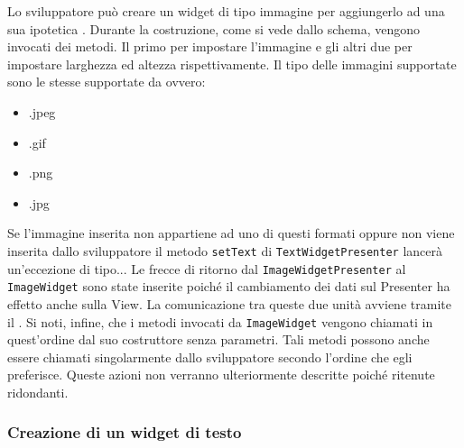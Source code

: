 Lo sviluppatore può creare un widget di tipo immagine per aggiungerlo ad una sua ipotetica . Durante la costruzione, come si vede dallo schema, vengono invocati dei metodi. Il primo per impostare l'immagine e gli altri due per impostare larghezza ed altezza rispettivamente. Il tipo delle immagini supportate sono le stesse supportate da  ovvero:
\begin{itemize}
\item .jpeg
\item .gif
\item .png
\item .jpg
\end{itemize}
Se l'immagine inserita non appartiene ad uno di questi formati oppure non viene inserita dallo sviluppatore il metodo \texttt{setText} di \texttt{TextWidgetPresenter} lancerà un'eccezione di tipo...
Le frecce di ritorno dal \texttt{ImageWidgetPresenter} al \texttt{ImageWidget} sono state inserite poiché il cambiamento dei dati sul Presenter ha effetto anche sulla View. La comunicazione tra queste due unità avviene tramite il  .
Si noti, infine, che i metodi invocati da \texttt{ImageWidget} vengono chiamati in quest'ordine dal suo costruttore senza parametri. Tali metodi possono anche essere chiamati singolarmente dallo sviluppatore secondo l'ordine che egli preferisce. Queste azioni non verranno ulteriormente descritte poiché ritenute ridondanti.

\newpage

\subsubsection{Creazione di un widget di testo}

